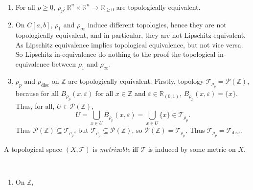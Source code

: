\begin{note} \ 
	\begin{enumerate}
		\item For all $p \ge 0$, $\rho_p: \mathbb R^n \times \mathbb R^n \to \mathbb R_{\ge 0}$ are topologically equivalent.
		
		\item On $C[a,b]$, $\rho_1$ and $\rho_\infty$ induce different topologies, hence they are not topologically equivalent, and in particular, they are not Lipschitz equivalent. As Lipschitz equivalence implies topological equivalence, but not vice versa. So Lipschitz in-equivalence do nothing to the proof the topological in-equivalence between $\rho_1$ and $\rho_\infty$. 
		
		\item $\rho_p$ and $\rho_\text{disc}$ on $\mathbb Z$ are topologically equivalent. Firstly, topology $\mathcal T_{\rho_p} = \mathcal P(\mathbb Z)$, because for all $B_{\rho_p} (x, \varepsilon)$ for all $x \in \mathbb Z$ and $\varepsilon \in \mathbb R_{(0,1)}$,  $B_{\rho_p}(x, \varepsilon) = \{x\}$. Thus, for all, $U \in \mathcal P(\mathbb Z)$,
			$$
			U = \bigcup_{x \in U} B_{\rho_p}(x, \varepsilon) = \bigcup_{x \in U} \{x\} \in \mathcal T_{\rho_p}.
			$$
			Thus $\mathcal P(\mathbb Z) \subseteq \mathcal T_{\rho_p}$, but $\mathcal T_{\rho_p} \subseteq \mathcal P(\mathbb Z)$, so $\mathcal P(\mathbb Z) = \mathcal T_{\rho_p}$. Thus $\mathcal T_{\rho_p} = \mathcal T_\text{disc}$.
	\end{enumerate}
\end{note}


\begin{definition}
	A topological space $(X, \mathcal T)$ is \textit{metrizable} iff $\mathcal T$ is induced by some metric on $X$.
\end{definition}


\begin{note} \
	\begin{enumerate}
		\item On $\mathbb Z$, 
	\end{enumerate}
\end{note}

































%